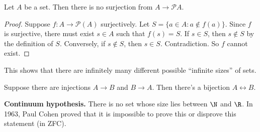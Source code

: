 \documentclass[a4paper]{article}
\begin{document}
  \begin{thm}
    Let $A$ be a set. Then there is no surjection from $A\to \mathcal{P}A$. 
  \end{thm}

  \begin{proof}
    Suppose $f: A\to \mathcal{P}(A)$ surjectively. Let $S = \{a\in A: a\not\in f(a)\}$. Since $f$ is surjective, there must exist $s\in A$ such that $f(s) = S$. If $s\in S$, then $s\not\in S$ by the definition of $S$. Conversely, if $s\not\in S$, then $s\in S$. Contradiction. So $f$ cannot exist. 
  \end{proof}

  This shows that there are infinitely many different possible ``infinite sizes'' of sets.

  \begin{thm}
    Suppose there are injections $A\to B$ and $B\to A$. Then there's a bijection $A\leftrightarrow B$. 
  \end{thm}

  \noindent \textbf{Continuum hypothesis.} There is no set whose size lies between $\N$ and $\R$.
  In 1963, Paul Cohen proved that it is impossible to prove this or disprove this statement (in ZFC).
  
\end{document}
